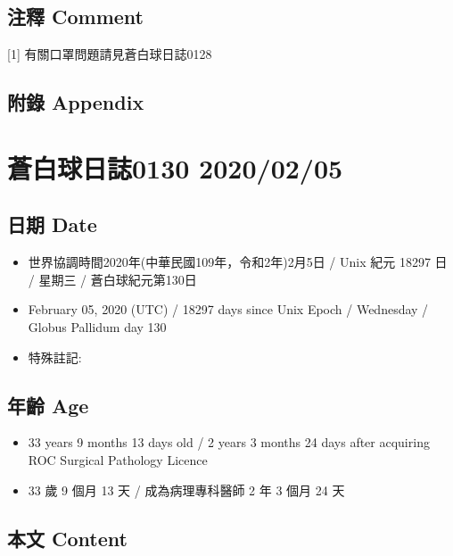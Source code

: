 \documentclass[
]{article}
\providecommand{\tightlist}{%
  \setlength{\itemsep}{0pt}\setlength{\parskip}{0pt}}
\begin{document}
\hypertarget{ux6ce8ux91cb-comment-3}{%
\subsection{注釋 Comment}\label{ux6ce8ux91cb-comment-3}}

{[}1{]} 有關口罩問題請見蒼白球日誌0128

\hypertarget{ux9644ux9304-appendix-3}{%
\subsection{附錄 Appendix}\label{ux9644ux9304-appendix-3}}

\hypertarget{ux84bcux767dux7403ux65e5ux8a8c0130-20200205}{%
\section{蒼白球日誌0130
2020/02/05}\label{ux84bcux767dux7403ux65e5ux8a8c0130-20200205}}

\hypertarget{ux65e5ux671f-date-4}{%
\subsection{日期 Date}\label{ux65e5ux671f-date-4}}

\begin{itemize}
\tightlist
\item
  世界協調時間2020年(中華民國109年，令和2年)2月5日 / Unix 紀元 18297 日
  / 星期三 / 蒼白球紀元第130日
\item
  February 05, 2020 (UTC) / 18297 days since Unix Epoch / Wednesday /
  Globus Pallidum day 130
\item
  特殊註記:
\end{itemize}

\hypertarget{ux5e74ux9f61-age-4}{%
\subsection{年齡 Age}\label{ux5e74ux9f61-age-4}}

\begin{itemize}
\tightlist
\item
  33 years 9 months 13 days old / 2 years 3 months 24 days after
  acquiring ROC Surgical Pathology Licence
\item
  33 歲 9 個月 13 天 / 成為病理專科醫師 2 年 3 個月 24 天
\end{itemize}

\hypertarget{ux672cux6587-content-4}{%
\subsection{本文 Content}\label{ux672cux6587-content-4}}
\end{document}
